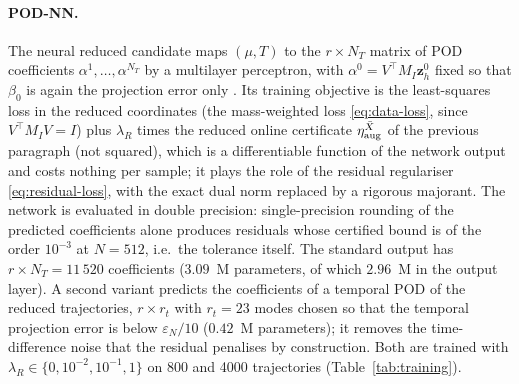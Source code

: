 \documentclass[11pt]{amsart}
\theoremstyle{remark}
\newcommand{\zz}{\mathbf z}
\begin{document}
\paragraph{POD-NN.}
The neural reduced candidate maps $(\mu,T)$ to the $r\times N_T$ matrix of POD coefficients
$\alpha^1,\dots,\alpha^{N_T}$ by a multilayer perceptron, with $\alpha^0=V^\top M_I\zz_h^0$ fixed
so that $\beta_0$ is again the projection error only
\cite{HesthavenUbbiali2018}.  Its training objective is the least-squares loss in the reduced
coordinates (the mass-weighted loss \eqref{eq:data-loss}, since $V^\top M_IV=I$) plus
$\lambda_R$ times the reduced online certificate $\eta^{\bar X}_{\rm aug}$ of the previous paragraph
(not squared), which is a differentiable function of the network output and costs nothing per
sample; it plays the role of the residual regulariser \eqref{eq:residual-loss}, with the exact dual
norm replaced by a rigorous majorant.  The network is evaluated in double precision: single-precision rounding of the
predicted coefficients alone produces residuals whose certified bound is of the order $10^{-3}$ at
$N=512$, i.e.\ the tolerance itself.  The standard output has $r\times N_T=11\,520$ coefficients ($3.09$~M parameters, of which $2.96$~M in
the output layer).  A second variant predicts the coefficients of a temporal POD of the reduced
trajectories, $r\times r_t$ with $r_t=23$ modes chosen so that the temporal projection error is
below $\varepsilon_N/10$ ($0.42$~M parameters); it removes the time-difference noise that the
residual penalises by construction.  Both are trained with $\lambda_R\in\{0,10^{-2},10^{-1},1\}$ on
800 and 4000 trajectories (Table~\ref{tab:training}).
\end{document}
